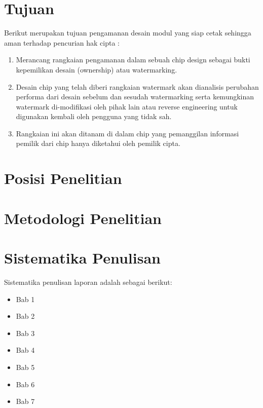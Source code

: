 \section{Tujuan}
Berikut merupakan tujuan pengamanan desain modul yang siap cetak
sehingga aman terhadap pencurian hak cipta :
\begin{enumerate}
	\item Merancang rangkaian pengamanan dalam sebuah chip design sebagai
	bukti kepemilikan desain (ownership) atau watermarking.
	
	\item Desain chip yang telah diberi rangkaian watermark akan dianalisis
	perubahan performa dari desain sebelum dan sesudah watermarking
	serta kemungkinan watermark di-modifikasi oleh pihak lain atau
	reverse engineering untuk digunakan kembali oleh pengguna yang tidak
	sah.
	
	\item Rangkaian ini akan ditanam di dalam chip yang pemanggilan informasi
	pemilik dari chip hanya diketahui oleh pemilik cipta.
\end{enumerate}

\section{Posisi Penelitian}


\section{Metodologi Penelitian}


\section{Sistematika Penulisan}

Sistematika penulisan laporan adalah sebagai berikut:
\begin{itemize}
	\item Bab 1 \babSatu \\
	\item Bab 2 \babDua \\
	\item Bab 3 \babTiga \\
	\item Bab 4 \babEmpat \\
	\item Bab 5 \babLima \\
	\item Bab 6 \babEnam \\
	\item Bab 7 \kesimpulan \\
\end{itemize}

